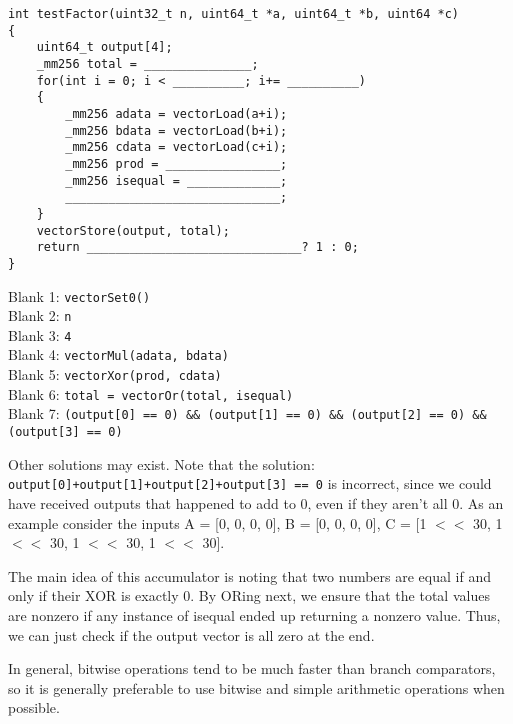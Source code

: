 \begin{verbatim}
int testFactor(uint32_t n, uint64_t *a, uint64_t *b, uint64 *c)
{
    uint64_t output[4];
    _mm256 total = _______________;
    for(int i = 0; i < __________; i+= __________)
    {
        _mm256 adata = vectorLoad(a+i);
        _mm256 bdata = vectorLoad(b+i);
        _mm256 cdata = vectorLoad(c+i);
        _mm256 prod = ________________;
        _mm256 isequal = _____________;
        ______________________________;
    }
    vectorStore(output, total);
    return ______________________________? 1 : 0;
}
\end{verbatim}

\begin{solution}[0.5in]
Blank 1: \texttt{vectorSet0()} \\
Blank 2: \texttt{n} \\
Blank 3: \texttt{4} \\
Blank 4: \texttt{vectorMul(adata, bdata)} \\
Blank 5: \texttt{vectorXor(prod, cdata)} \\
Blank 6: \texttt{total = vectorOr(total, isequal)} \\
Blank 7: \texttt{(output[0] == 0) \&\& (output[1] == 0) \&\& (output[2] == 0) \&\& (output[3] == 0)}

Other solutions may exist. Note that the solution: \texttt{output[0]+output[1]+output[2]+output[3] == 0} is incorrect, since we could have received outputs that happened to add to 0, even if they aren’t all 0. As an example consider the inputs A = [0, 0, 0, 0], B = [0, 0, 0, 0], C = [1 $<<$ 30, 1 $<<$ 30, 1 $<<$ 30, 1 $<<$ 30].

The main idea of this accumulator is noting that two numbers are equal if and only if their XOR is exactly 0. By ORing next, we ensure that the total values are nonzero if any instance of isequal ended up returning a nonzero value. Thus, we can just check if the output vector is all zero at the end.

In general, bitwise operations tend to be much faster than branch comparators, so it is generally preferable to use bitwise and simple arithmetic operations when possible.
\end{solution}


